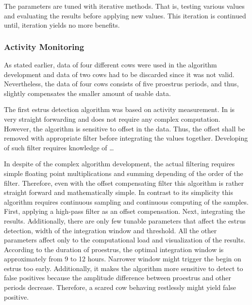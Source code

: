 \documentclass[english,12pt,a4paper,pdftex,elec,utf8]{aaltothesis}
\begin{document}
The parameters are tuned with iterative methods. That is, testing various values and evaluating the results before applying new values. This iteration is continued until, iteration yields no more benefits.


\subsubsection{Activity Monitoring} \label{activitymeasurementevaluation}

As stated earlier, data of four different cows were used in the algorithm development and data of two cows had to be discarded since it was not valid. Nevertheless, the data of four cows consists of five proestrus periods, and thus, slightly compensates the smaller amount of usable data.

The first estrus detection algorithm was based on activity measurement. In is very straight forwarding and does not require any complex computation. However, the algorithm is sensitive to offset in the data. Thus, the offset shall be removed with appropriate filter before integrating the values together. Developing of such filter requires knowledge of \dots

In despite of the complex algorithm development, the actual filtering requires simple floating point multiplications and summing depending of the order of the filter. Therefore, even with the offset compensating filter this algorithm is rather straight forward and mathematically simple. In contrast to its simplicity this algorithm requires continuous sampling and continuous computing of the samples. First, applying a high-pass filter as an offset compensation. Next, integrating the results. Additionally, there are only few tunable parameters that affect the estrus detection, width of the integration window and threshold. All the other parameters affect only to the computational load and visualization of the results.\\

According to the duration of proestrus, the optimal integration window is approximately from 9 to 12 hours. Narrower window might trigger the begin on estrus too early. Additionally, it makes the algorithm more sensitive to detect to false positives because the amplitude difference between proestrus and other periods decrease. Therefore, a scared cow behaving restlessly might yield false positive.
\end{document}
